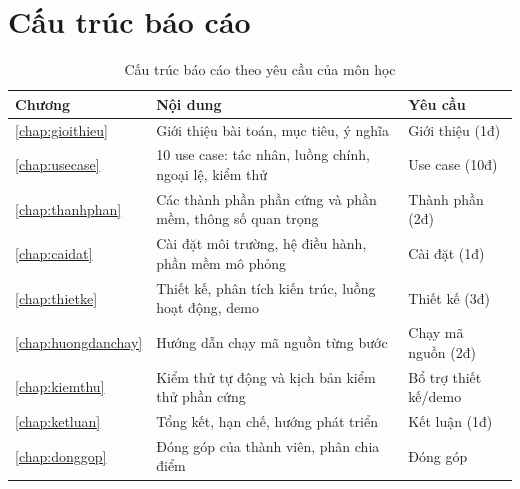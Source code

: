 \section{Cấu trúc báo cáo}
\begin{table}[H]
\centering\small
\caption{Cấu trúc báo cáo theo yêu cầu của môn học}\label{tab:cautruc}
\begin{tabularx}{\linewidth}{@{}lXl@{}}
\toprule
\textbf{Chương} & \textbf{Nội dung} & \textbf{Yêu cầu} \\ \midrule
\ref{chap:gioithieu} & Giới thiệu bài toán, mục tiêu, ý nghĩa & Giới thiệu (1đ) \\
\ref{chap:usecase} & 10 use case: tác nhân, luồng chính, ngoại lệ, kiểm thử & Use case (10đ) \\
\ref{chap:thanhphan} & Các thành phần phần cứng và phần mềm, thông số quan trọng & Thành phần (2đ) \\
\ref{chap:caidat} & Cài đặt môi trường, hệ điều hành, phần mềm mô phỏng & Cài đặt (1đ) \\
\ref{chap:thietke} & Thiết kế, phân tích kiến trúc, luồng hoạt động, demo & Thiết kế (3đ) \\
\ref{chap:huongdanchay} & Hướng dẫn chạy mã nguồn từng bước & Chạy mã nguồn (2đ) \\
\ref{chap:kiemthu} & Kiểm thử tự động và kịch bản kiểm thử phần cứng & Bổ trợ thiết kế/demo \\
\ref{chap:ketluan} & Tổng kết, hạn chế, hướng phát triển & Kết luận (1đ) \\
\ref{chap:donggop} & Đóng góp của thành viên, phân chia điểm & Đóng góp \\
\bottomrule
\end{tabularx}
\end{table}

